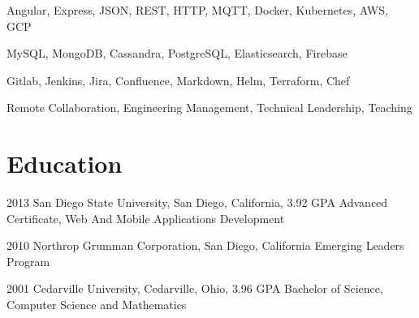 \documentclass{article}
\begin{document}
  {Angular, Express, JSON, REST, HTTP, MQTT, Docker, Kubernetes, AWS, GCP}

  {MySQL, MongoDB, Cassandra, PostgreSQL, Elasticsearch, Firebase}

  {Gitlab, Jenkins, Jira, Confluence, Markdown, Helm, Terraform, Chef}

  {Remote Collaboration, Engineering Management, Technical Leadership, Teaching}


\section{Education}

\education
  {2013}
  {San Diego State University, San Diego, California, 3.92 GPA}
  {Advanced Certificate, Web And Mobile Applications Development}

\education
  {2010}
  {Northrop Grumman Corporation, San Diego, California}
  {Emerging Leaders Program}

\education
  {2001}
  {Cedarville University, Cedarville, Ohio, 3.96 GPA}
  {Bachelor of Science, Computer Science and Mathematics}


\end{document}
